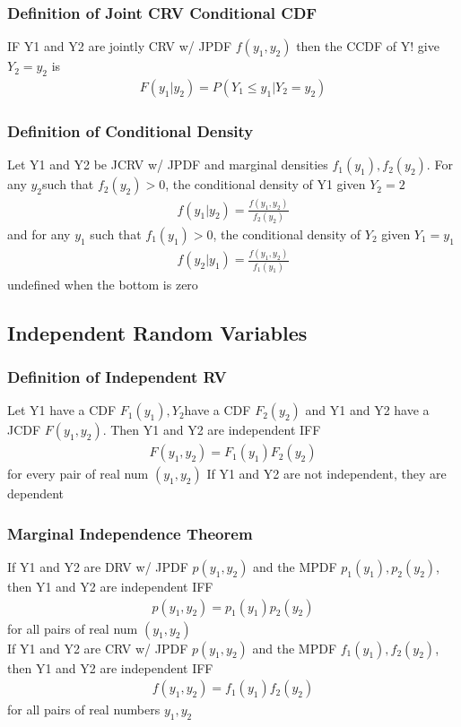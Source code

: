 \documentclass[12pt]{article}
\begin{document}
	\subsubsection{Definition of Joint CRV Conditional CDF}
		IF Y1 and Y2 are jointly CRV w/ JPDF $ f(y_1, y_2) $
		then the CCDF of Y! give $ Y_2 = y_2 $ is
		\begin{align*}
			F(y_1 | y_2) = P(Y_1 \le y_1|Y_2 = y_2)
		\end{align*}
	\subsubsection{Definition of Conditional Density}
		Let Y1 and Y2 be JCRV w/ JPDF and marginal densities $ f_1(y_1),
		f_2(y_2) $. For any $ y_2 $such that $ f_2(y_2) > 0 $, the conditional
		density of Y1 given $ Y_2 = 2 $
		\begin{align*}
			f(y_1 | y_2) = \frac{f(y_1, y_2)}{f_2(y_2)} 
		\end{align*}
		and for any $ y_1 $ such that $ f_1(y_1) > 0 $, the conditional density
		of $ Y_2 $ given $ Y_1 = y_1 $
		\begin{align*}
			f(y_2|y_1) =  \frac{f(y_1, y_2)}{f_1(y_1)} 
		\end{align*}
		undefined when the bottom is zero
\subsection{Independent Random Variables}
	\subsubsection{Definition of Independent RV}
		Let Y1 have a CDF $ F_1(y_1), Y_2 $have a CDF $ F_2(y_2) $
		and Y1 and Y2 have a JCDF $ F(y_1, y_2) $. Then Y1 and Y2 are
		independent IFF
		\begin{align*}
			F(y_1, y_2) = F_1(y_1)F_2(y_2)
		\end{align*}
		for every pair of real num $ (y_1, y_2) $
			If Y1 and Y2 are not independent, they are dependent
	\subsubsection{Marginal Independence Theorem}
		If Y1 and Y2 are DRV w/ JPDF $ p(y_1, y_2) $ and the MPDF
		$ p_1(y_1), p_2(y_2) $, then Y1 and Y2 are independent IFF
		\begin{align*}
			p(y_1, y_2) = p_1(y_1)p_2(y_2)
		\end{align*}
		for all pairs of real num $ (y_1, y_2) $\\
		If Y1 and Y2 are CRV w/ JPDF $ p(y_1, y_2) $ and the MPDF
		$ f_1(y_1), f_2(y_2) $, then Y1 and Y2 are independent IFF
		\begin{align*}
			f(y_1, y_2) = f_1(y_1)f_2(y_2)
		\end{align*}
		for all pairs of real numbers $ y_1, y_2 $
\end{document}
